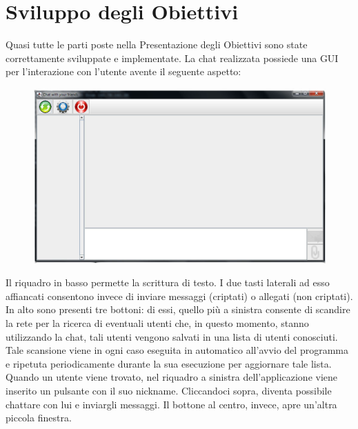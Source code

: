 \section{Sviluppo degli Obiettivi}
Quasi tutte le parti poste nella Presentazione degli Obiettivi sono state correttamente
sviluppate e implementate. La chat realizzata possiede una GUI per l'interazione
con l'utente avente il seguente aspetto:
\begin{figure}[h]
\centering
\includegraphics[scale=0.4]{gui1.jpg}
\label{fig:gui}
\end{figure}

Il riquadro in basso permette la scrittura di testo.
I due tasti laterali ad esso affiancati
consentono invece di inviare messaggi (criptati) o allegati (non criptati).
In alto sono presenti tre bottoni:
di essi, quello più a sinistra consente di scandire la rete per la ricerca di eventuali 
utenti che, in questo momento, stanno utilizzando la chat, tali utenti vengono salvati
in una lista di utenti conosciuti.
Tale scansione viene in ogni caso eseguita in automatico all'avvio del programma
e ripetuta periodicamente durante la sua esecuzione per aggiornare tale lista.
Quando un utente viene trovato, nel riquadro a sinistra 
dell'applicazione viene inserito un pulsante con il suo nickname.
Cliccandoci sopra, diventa possibile chattare con lui e inviargli messaggi.
Il bottone al centro, invece, apre un'altra piccola finestra.

